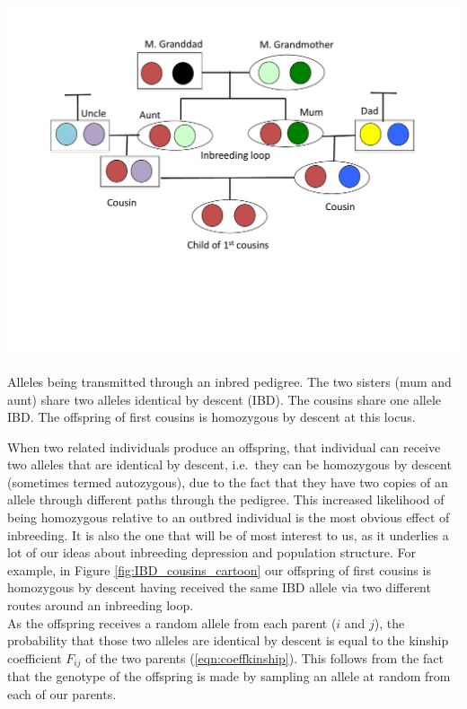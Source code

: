 {{\begin{marginfigure}
\begin{center}
\includegraphics[width= \textwidth]{figures/Child_first_cousins_Homozy_BD.pdf}
\end{center}
\caption{Alleles being transmitted through an inbred pedigree. The two sisters (mum and aunt) share two alleles identical by descent (IBD). The cousins share one
  allele IBD. The offspring of first cousins is homozygous by
  descent at this locus.} \label{fig:IBD_cousins_cartoon}
\end{marginfigure}
When two related individuals produce an offspring, that individual can
receive two alleles that are identical by descent, i.e.\ they
can be homozygous by descent (sometimes termed autozygous), due to the
fact that they have two copies of an allele through different paths
through the pedigree.  This increased likelihood of being homozygous
relative to an outbred individual is the most obvious effect of
inbreeding. It is also the one that will be of most interest to us, as it
underlies a lot of our ideas about inbreeding depression and
population structure. For example, in Figure \ref{fig:IBD_cousins_cartoon} our
offspring of first cousins is homozygous by descent having received
the same IBD allele via two different routes around an inbreeding loop.\\

As the offspring receives a random allele from each parent ($i$ and $j$), the
probability that those two alleles are identical by descent is equal to the
kinship coefficient $F_{ij}$ of the two parents (\eqn \ref{eqn:coeffkinship}). This follows from the fact that
the genotype of the offspring is made by sampling an allele at random from each
of our parents. %

}}
